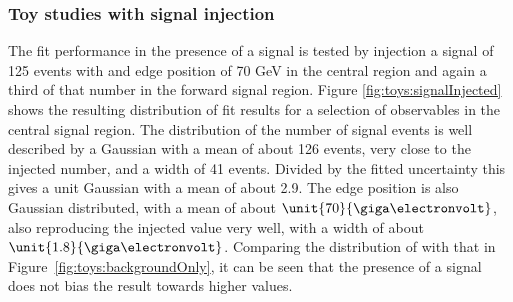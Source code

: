 \subsubsection{Toy studies with signal injection}
The fit performance in the presence of a signal is tested by injection a signal of 125 events with and edge position of 70 GeV in the central region and again a third of that number in the forward signal region. Figure \ref{fig:toys:signalInjected} shows the resulting distribution of fit results for a selection of observables in the central signal region. The distribution of the number of signal events is well described by a Gaussian with a mean of about 126 events, very close to the injected number, and a width of 41 events. Divided by the fitted uncertainty this gives a unit Gaussian with a mean of about 2.9. The edge position is also Gaussian distributed, with a mean of about $\unit{70}{\giga\electronvolt}$, also reproducing the injected value very well, with a width of about $\unit{1.8}{\giga\electronvolt}$. Comparing the distribution of \Rsfof with that in Figure~\ref{fig:toys:backgroundOnly}, it can be seen that the presence of a signal does not bias the result towards higher values. 
